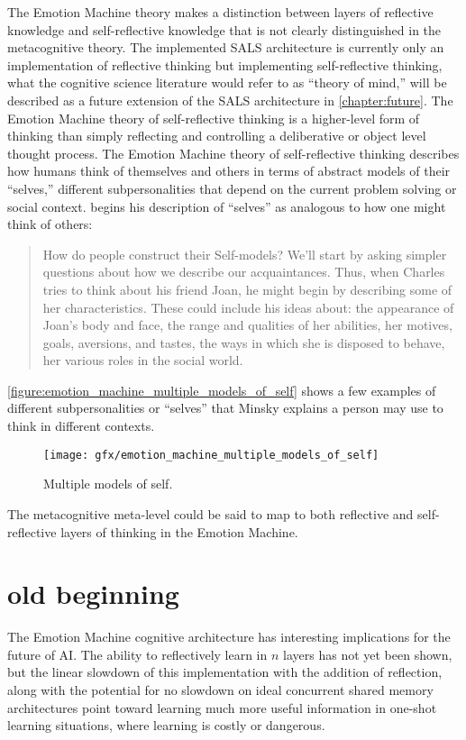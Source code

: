The Emotion Machine theory makes a distinction between layers of
reflective knowledge and self-reflective knowledge that is not clearly
distinguished in the metacognitive theory.  The implemented SALS
architecture is currently only an implementation of reflective
thinking but implementing self-reflective thinking, what the cognitive
science literature would refer to as ``theory of mind,'' will be
described as a future extension of the SALS architecture in
{\mbox{\autoref{chapter:future}}}.  The Emotion Machine theory of
self-reflective thinking is a higher-level form of thinking than
simply reflecting and controlling a deliberative or object level
thought process.  The Emotion Machine theory of self-reflective
thinking describes how humans think of themselves and others in terms
of abstract models of their ``selves,'' different subpersonalities
that depend on the current problem solving or social context.
\cite{minsky:2006} begins his description of ``selves'' as analogous
to how one might think of others:
\begin{quote}
How do people construct their Self-models?  We'll start by asking
simpler questions about how we describe our acquaintances.  Thus, when
Charles tries to think about his friend Joan, he might begin by
describing some of her characteristics.  These could include his ideas
about: the appearance of Joan's body and face, the range and qualities
of her abilities, her motives, goals, aversions, and tastes, the ways
in which she is disposed to behave, her various roles in the social
world.
\end{quote}
{\mbox{\autoref{figure:emotion_machine_multiple_models_of_self}}}
shows a few examples of different subpersonalities or ``selves'' that
Minsky explains a person may use to think in different contexts.
\begin{figure}
\centering
\texttt{[image: gfx/emotion\_machine\_multiple\_models\_of\_self]}
\caption{Multiple models of self.}
\label{figure:emotion_machine_multiple_models_of_self}
\end{figure}
The metacognitive meta-level could be said to map to both reflective
and self-reflective layers of thinking in the Emotion Machine.


\section{old beginning}


The Emotion Machine cognitive architecture has interesting
implications for the future of AI.  The ability to reflectively learn
in $n$ layers has not yet been shown, but the linear slowdown of this
implementation with the addition of reflection, along with the
potential for no slowdown on ideal concurrent shared memory
architectures point toward learning much more useful information in
one-shot learning situations, where learning is costly or dangerous.


